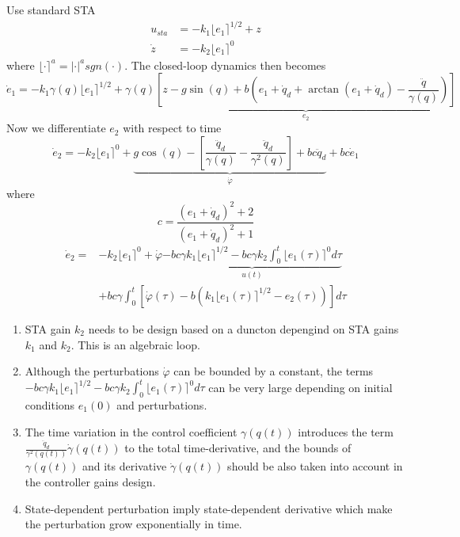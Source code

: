     Use standard STA
    \begin{equation*}
        \begin{split}
            u_{sta} &= -k_1 \lfloor e_1 \rceil^{1/2} + z \\
            \dot{z} &= -k_2 \lfloor e_1 \rceil^{0}
        \end{split}
    \end{equation*}
    where $\lfloor \cdot \rceil^a = \lvert \cdot \rvert^a sgn(\cdot)$. The closed-loop dynamics then becomes 
    \begin{equation}
        \dot{e}_1 = -k_1 \gamma(q) \lfloor e_1 \rceil^{1/2} + \gamma(q)
        \underbrace{
            \left[z - g\sin(q) + b\left(e_1 + \dot{q}_d + \arctan(e_1 + \dot{q}_d) - \frac{\ddot{q}}{\gamma(q)}\right)\right]
            }_{e_2}
    \end{equation}
    Now we differentiate $e_2$ with respect to time
    \begin{equation}
        \dot{e}_2 = -k_2\lfloor e_1 \rceil^0 +
        \underbrace{
            g\cos(q) - \left[\frac{\ddot{q}_d}{\gamma(q)} - \frac{\ddot{q}_d}{\gamma^2(q)}\right] + bc\ddot{q}_d
        }_{\dot{\varphi}}
        + bc\dot{e}_1
    \end{equation}
    where 
    \begin{equation*}
        c = \frac{(e_1 + \dot{q}_d)^2 + 2}{(e_1 + \dot{q}_d)^2 + 1}
    \end{equation*}
    \begin{equation}
        \begin{split}
        \dot{e}_2 = &-k_2 \lfloor e_1 \rceil^0 + \dot{\varphi} \underbrace{- bc\gamma k_1 \lfloor e_1 \rceil^{1/2} - bc\gamma k_2 \int_{0}^{t} \lfloor e_1(\tau) \rceil^0 d\tau}_{u(t)} \\
        &+ bc\gamma \int_{0}^{t} \left[\dot{\varphi}(\tau) - b\left(k_1 \lfloor e_1(\tau) \rceil^{1/2}- e_2(\tau)\right)\right]d\tau
        \end{split} 
    \end{equation}
    \begin{enumerate}
        \item STA gain $k_2$ needs to be design based on a duncton depengind on STA gains $k_1$ and $k_2$. This is an algebraic loop.
        \item Although the perturbations $\dot{\varphi}$ can be bounded by a constant, the terms $- bc\gamma k_1 \lfloor e_1 \rceil^{1/2} - bc\gamma k_2 \int_{0}^{t} \lfloor e_1(\tau) \rceil^0 d\tau$ can be very large depending on initial conditions $e_1(0)$ and perturbations.
        \item The time variation in the control coefficient $\gamma(q(t))$ introduces the term $\frac{\ddot{q}_d}{\gamma^2(q(t))}\dot{\gamma}(q(t))$ to the total time-derivative, and the bounds of $\gamma(q(t))$ and its derivative $\dot{\gamma}(q(t))$ should be also taken into account in the controller gains design.
        \item State-dependent perturbation imply state-dependent derivative which make the perturbation grow exponentially in time.
    \end{enumerate}

